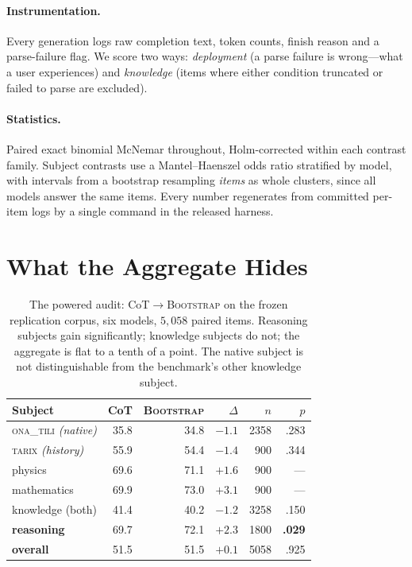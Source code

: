\documentclass[11pt]{article}
\newcommand{\ona}{\textsc{ona\_tili}}
\newcommand{\tarix}{\textsc{tarix}}
\newcommand{\bsfs}{\textsc{BootstrapFewShot}}
\newcommand{\bsfsS}{\textsc{Bootstrap}}   %
\begin{document}
\paragraph{Instrumentation.} Every generation logs raw completion text, token counts,
finish reason and a parse-failure flag. We score two ways: \emph{deployment} (a parse
failure is wrong---what a user experiences) and \emph{knowledge} (items where either
condition truncated or failed to parse are excluded).
\paragraph{Statistics.} Paired exact binomial McNemar throughout, Holm-corrected within
each contrast family. Subject contrasts use a Mantel--Haenszel odds ratio stratified by
model, with intervals from a bootstrap resampling \emph{items} as whole clusters, since
all models answer the same items. Every number regenerates from committed per-item logs
by a single command in the released harness.

\section{What the Aggregate Hides}\label{sec:powered}

\begin{table}[t]\centering\small
\caption{The powered audit: CoT${\to}$\bsfsS{} on the frozen replication corpus, six
models, $5{,}058$ paired items. Reasoning subjects gain significantly; knowledge
subjects do not; the aggregate is flat to a tenth of a point. The native subject is not
distinguishable from the benchmark's other knowledge subject.}
\label{tab:powered}
\setlength{\tabcolsep}{2.5pt}
\begin{tabular}{lrrrrr}
\toprule
Subject & CoT & \bsfsS{} & $\Delta$ & $n$ & $p$ \\
\midrule
\ona{} \emph{(native)} & 35.8 & 34.8 & $-1.1$ & 2358 & .283 \\
\tarix{} \emph{(history)} & 55.9 & 54.4 & $-1.4$ & \phantom{0}900 & .344 \\
physics                & 69.6 & 71.1 & $+1.6$ & \phantom{0}900 & --- \\
mathematics            & 69.9 & 73.0 & $+3.1$ & \phantom{0}900 & --- \\
\midrule
knowledge (both)       & 41.4 & 40.2 & $-1.2$ & 3258 & .150 \\
\textbf{reasoning}     & 69.7 & 72.1 & $\mathbf{+2.3}$ & 1800 & \textbf{.029} \\
\midrule
\textbf{overall}       & 51.5 & 51.5 & $\mathbf{+0.1}$ & 5058 & .925 \\
\bottomrule
\end{tabular}
\end{table}
\end{document}
